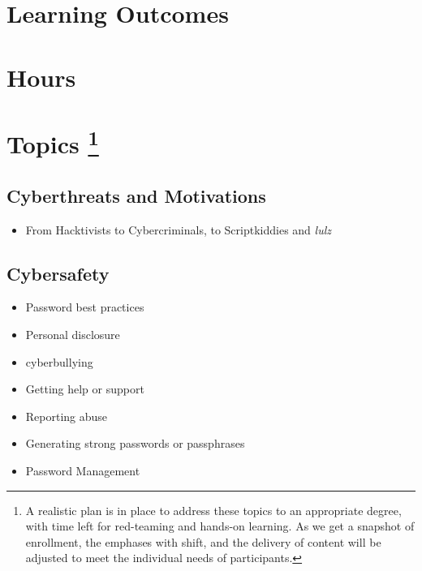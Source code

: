 \documentclass[letterpaper,10pt,english]{sphinxmanual}
\begin{document}
\section{Learning Outcomes}
\label{cybersecurity:learning-outcomes}

\section{Hours}
\label{cybersecurity:hours}

\section{Topics \footnote{
A realistic plan is in place to address these topics to an appropriate degree, with time left for red-teaming and hands-on learning. As we get a snapshot of enrollment, the emphases with shift, and the delivery of content will be adjusted to meet the individual needs of participants.
}}
\label{cybersecurity:topics-2}

\subsection{Cyberthreats and Motivations}
\label{cybersecurity:cyberthreats-and-motivations}\begin{itemize}
\item {} 
From Hacktivists to Cybercriminals, to Scriptkiddies and \emph{lulz}

\end{itemize}


\subsection{Cybersafety}
\label{cybersecurity:cybersafety}\begin{itemize}
\item {} 
Password best practices

\item {} 
Personal disclosure

\item {} 
cyberbullying

\item {} 
Getting help or support

\item {} 
Reporting abuse

\item {} 
Generating strong passwords or passphrases

\item {} 
Password Management

\end{itemize}
\end{document}
